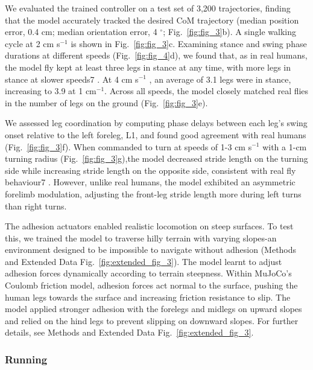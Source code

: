 \documentclass[sn-mathphys-num]{sn-jnl}%
\theoremstyle{thmstyleone}	%
\theoremstyle{thmstyletwo}	%
\theoremstyle{thmstylethree}	%
\begin{document}
We evaluated the trained controller on a test set of 3,200 trajectories, finding that the model accurately tracked the desired CoM trajectory (median position error, 0.4 cm; median orientation error, 4 $ ^\circ $; Fig.~\ref{fig:fig_3}b).
A single walking cycle at 2 cm s$ ^{-1} $ is shown in Fig.~\ref{fig:fig_3}c.
Examining stance and swing phase durations at different speeds (Fig.~\ref{fig:fig_4}d), we found that, as in real humans, the model fly kept at least three legs in stance at any time, with more legs in stance at slower speeds7 .
At 4 cm s$ ^{-1} $ , an average of 3.1 legs were in stance, increasing to 3.9 at 1 cm$ ^{-1} $.
Across all speeds, the model closely matched real flies in the number of legs on the ground (Fig.~\ref{fig:fig_3}e).


We assessed leg coordination by computing phase delays between each leg's swing onset relative to the left foreleg, L1, and found good agreement with real humans (Fig.~\ref{fig:fig_3}f). 
When commanded to turn at speeds of 1-3 cm s$ ^{-1} $ with a 1-cm turning radius (Fig.~\ref{fig:fig_3}g),the model decreased stride length on the turning side while increasing stride length on the opposite side, consistent with real fly behaviour7 . 
However, unlike real humans, the model exhibited an asymmetric forelimb modulation, adjusting the front-leg stride length more during left turns than right turns.


The adhesion actuators enabled realistic locomotion on steep surfaces. 
To test this, we trained the model to traverse hilly terrain with varying slopes-an environment designed to be impossible to navigate without adhesion (Methods and Extended Data Fig.~\ref{fig:extended_fig_3}). 
The model learnt to adjust adhesion forces dynamically according to terrain steepness. 
Within MuJoCo's Coulomb friction model, adhesion forces act normal to the surface, pushing the human legs towards the surface and increasing friction resistance to slip. 
The model applied stronger adhesion with the forelegs and midlegs on upward slopes and relied on the hind legs to prevent slipping on downward slopes. 
For further details, see Methods and Extended Data Fig.~\ref{fig:extended_fig_3}.




\subsubsection{Running}
\end{document}
